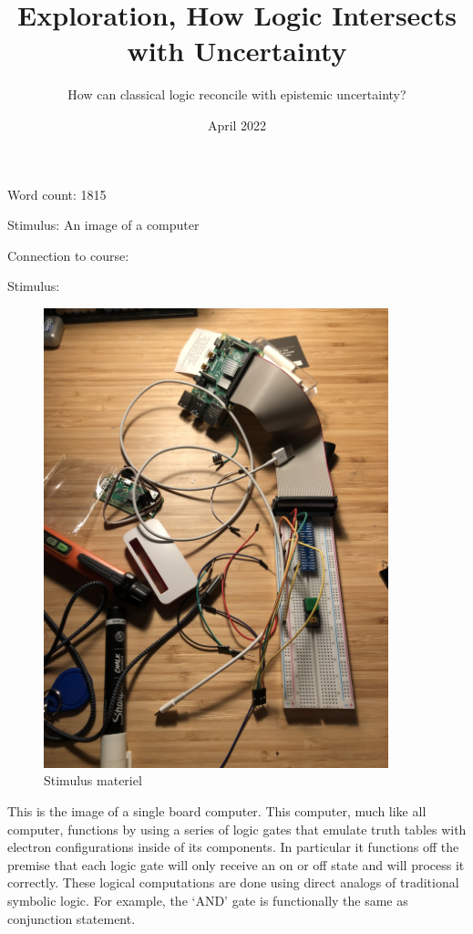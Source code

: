 \documentclass{article}
\title{Exploration, How Logic Intersects with Uncertainty}
\author{How can classical logic reconcile with epistemic uncertainty?}
\date{April 2022}
\begin{document}
\begin{titlepage}
\maketitle

\begin{center}
Word count: 1815

Stimulus: An image of a computer 

Connection to course: 
\end{center}
\end{titlepage}

\begin{center}
{\huge Stimulus:}


\begin{figure}[h]
    \centering
    \includegraphics[width=10cm]{newpi}
    \caption{Stimulus materiel}
    \label{fig:mesh1}
\end{figure}


\end{center}
This is the image of a single board computer. This computer, much like all computer, functions by using a series of logic gates that emulate truth tables with electron configurations inside of its components. In particular it functions off the premise that each logic gate will only receive an on or off state and will process it correctly. These logical computations are done using direct analogs of traditional symbolic logic. For example, the ‘AND’ gate is functionally the same as conjunction statement.
\end{document}
